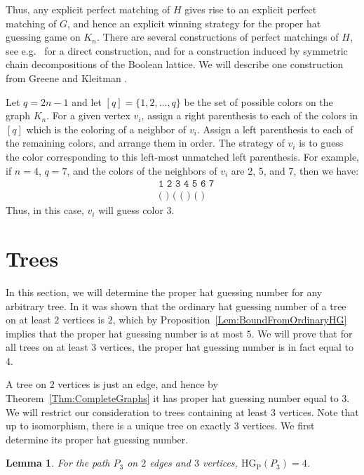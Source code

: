 \documentclass[a4paper,11pt]{amsproc}
\theoremstyle{plain}
\newtheorem{Lemma} [Theorem] {Lemma}
\theoremstyle{definition}
\newcommand{\HGP}{\mathrm{HG_{P}}}
\begin{document}
Thus, any explicit perfect matching of $H$ gives rise to an explicit perfect matching of $G$, and hence an explicit winning strategy for the proper hat guessing game on $K_n$.
There are several constructions of perfect matchings of $H$, see e.g.\ \cite{Kierstead1988} for a direct construction, and \cite{Greene1976} for a construction induced by symmetric chain decompositions of the Boolean lattice.
We will describe one construction from Greene and Kleitman \cite{Greene1976}.

Let $q = 2n-1$ and let $[q] = \{1, 2, \dots, q\}$ be the set of possible colors on the graph $K_n$. 
For a given vertex $v_i$, assign a right parenthesis to each of the colors in $[q]$ which is the coloring of a neighbor of $v_i$.
Assign a left parenthesis to each of the remaining colors, and arrange them in order.
The strategy of $v_i$ is to guess the color corresponding to this left-most unmatched left parenthesis.
For example, if $n=4$, $q=7$, and the colors of the neighbors of $v_i$ are 2, 5, and 7, then we have:
\begin{align*}
 &\texttt{1 2 3 4 5 6 7}\\
 &\texttt{( ) ( ( ) ( )}
\end{align*}
Thus, in this case, $v_i$ will guess color $3$.



\section{Trees}
\label{sec:trees}

In this section, we will determine the proper hat guessing number for any arbitrary tree. 
In \cite{Alon2020} it was shown that the ordinary hat guessing number of a tree on at least $2$ vertices is $2$, which by Proposition~\ref{Lem:BoundFromOrdinaryHG} implies that the proper hat guessing number is at most $5$. 
We will prove that for all trees on at least $3$ vertices, the proper hat guessing number is in fact equal to $4$.

A tree on $2$ vertices is just an edge, and hence by Theorem~\ref{Thm:CompleteGraphs} it has proper hat guessing number equal to $3$.
We will restrict our consideration to trees containing at least $3$ vertices.
Note that up to isomorphism, there is a unique tree on exactly $3$ vertices.
We first determine its proper hat guessing number. 

\begin{Lemma}\label{Lem:P3}
 For the path $P_3$ on $2$ edges and $3$ vertices, $\HGP(P_3) = 4$.
\end{Lemma}
\end{document}
